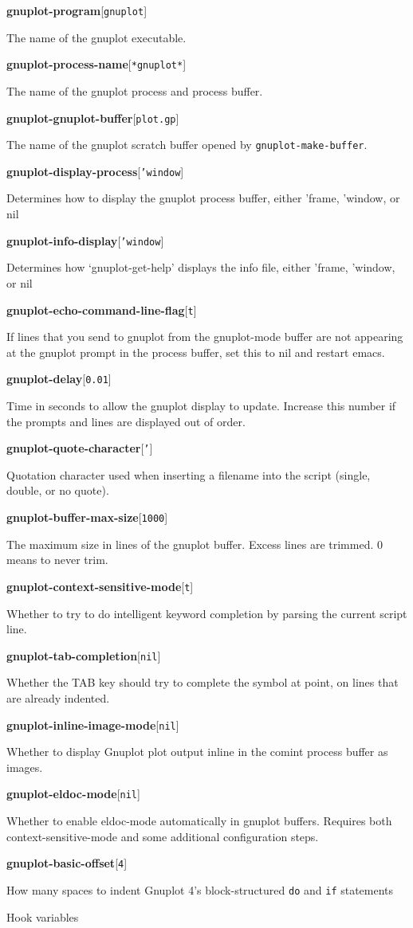 \documentclass[twocolumn]{article}
\newenvironment{Boxedminipage}%
{\begin{Sbox}\begin{minipage}}%
  {\end{minipage}\end{Sbox}\Ovalbox{\TheSbox}}
\def\variable#1#2#3{{
    \vspace{-0.2truecm}
    \begin{flushright}
      \begin{minipage}[h]{0.97\linewidth}
        \vspace{-0.2truecm}
        \textbf{#1}\hfill[\texttt{#2}]
        \begin{flushright}
          \begin{minipage}[h]{0.93\linewidth}
            \vspace{-0.2truecm}
            #3
          \end{minipage}
        \end{flushright}
      \end{minipage}
    \end{flushright}
    }}
\begin{document}
\variable{gnuplot-program}{gnuplot}{The name of the gnuplot
  executable.}
%
\variable{gnuplot-process-name}{*gnuplot*}{The name of the gnuplot
  process and process buffer.}
%
\variable{gnuplot-gnuplot-buffer}{plot.gp}{The name of the gnuplot
  scratch buffer opened by \texttt{gnuplot-make-buffer}.}
%
%
\variable{gnuplot-display-process}{'window}{Determines how to display
  the gnuplot process buffer, either 'frame, 'window, or nil}
%
\variable{gnuplot-info-display}{'window}{Determines how
  `gnuplot-get-help' displays the info file, either 'frame, 'window,
  or nil}
%
\variable{gnuplot-echo-command-line-flag}{t}{If lines that you send to
  gnuplot from the gnuplot-mode buffer are not appearing at the
  gnuplot prompt in the process buffer, set this to nil and restart
  emacs.}
%
\variable{gnuplot-delay}{0.01}{Time in seconds to allow the gnuplot
  display to update.  Increase this number if the prompts and lines
  are displayed out of order.}
%
\variable{gnuplot-quote-character}{'}{Quotation character used when
  inserting a filename into the script (single, double, or no quote).}

\variable{gnuplot-buffer-max-size}{1000}{The maximum size in lines of
the gnuplot buffer.  Excess lines are trimmed.  0 means to never trim.}
%
\variable{gnuplot-context-sensitive-mode}{t}{Whether to try to do
  intelligent keyword completion by parsing the current script line.}
%
\variable{gnuplot-tab-completion}{nil}{Whether the TAB key should try
  to complete the symbol at point, on lines that are already indented.}
%
\variable{gnuplot-inline-image-mode}{nil}{Whether to display Gnuplot
  plot output inline in the comint process buffer as images.}
%
\variable{gnuplot-eldoc-mode}{nil}{Whether to enable eldoc-mode
  automatically in gnuplot buffers. Requires both
  context-sensitive-mode and some additional configuration steps.}
%
\variable{gnuplot-basic-offset}{4}{How many spaces to indent Gnuplot
  4's block-structured \texttt{do} and \texttt{if} statements}


\vfill\eject

\begin{center}
  \begin{Boxedminipage}{0.75\linewidth}
    \begin{center}
      {\large Hook variables}
    \end{center}
  \end{Boxedminipage}
\end{center}
\end{document}
